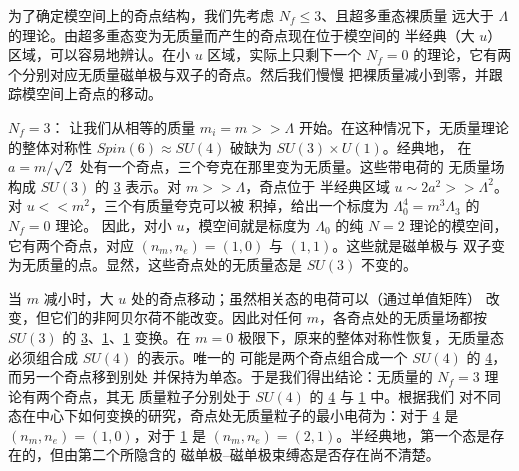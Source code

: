 
为了确定模空间上的奇点结构，我们先考虑 $N_f \leq 3$、且超多重态裸质量
远大于 $\Lambda$ 的理论。由超多重态变为无质量而产生的奇点现在位于模空间的
半经典（大 $u$）区域，可以容易地辨认。在小 $u$ 区域，实际上只剩下一个
$N_f=0$ 的理论，它有两个分别对应无质量磁单极与双子的奇点。然后我们慢慢
把裸质量减小到零，并跟踪模空间上奇点的移动。

\noindent\underline{$N_f = 3$}：
让我们从相等的质量 $m_i = m >> \Lambda$ 开始。在这种情况下，无质量理论
的整体对称性 $Spin(6)\approx SU(4)$ 破缺为 $SU(3) \times U(1)$。经典地，
在 $a = m/ \sqrt{2}$ 处有一个奇点，三个夸克在那里变为无质量。这些带电荷的
无质量场构成 $SU(3)$ 的 \underline{3} 表示。对 $m >> \Lambda$，奇点位于
半经典区域 $u \sim 2a^2 >> \Lambda^2$。对 $u<< m^2$，三个有质量夸克可以被
积掉，给出一个标度为 $\Lambda^{4}_{0} = m^3 \Lambda_3$ 的 $N_f=0$ 理论。
因此，对小 $u$，模空间就是标度为 $\Lambda_{0}$ 的纯 $N = 2$ 理论的模空间，
它有两个奇点，对应 $(n_m , n_e) = (1,0)$ 与 $(1,1)$。这些就是磁单极与
双子变为无质量的点。显然，这些奇点处的无质量态是 $SU(3)$ 不变的。

当 $m$ 减小时，大 $u$ 处的奇点移动；虽然相关态的电荷可以（通过单值矩阵）
改变，但它们的非阿贝尔荷不能改变。因此对任何 $m$，各奇点处的无质量场都按
$SU(3)$ 的 \underline{3}、\underline{1}、\underline{1} 变换。在 $m = 0$
极限下，原来的整体对称性恢复，无质量态必须组合成 $SU(4)$ 的表示。唯一的
可能是两个奇点组合成一个 $SU(4)$ 的 \underline{4}，而另一个奇点移到别处
并保持为单态。于是我们得出结论：无质量的 $N_f = 3$ 理论有两个奇点，其无
质量粒子分别处于 $SU(4)$ 的 \underline{4} 与 \underline{1} 中。根据我们
对不同态在中心下如何变换的研究，奇点处无质量粒子的最小电荷为：对于
\underline{4} 是 $(n_m , n_e) = (1,0)$，对于 \underline{1} 是
$(n_m, n_e) = (2,1)$。半经典地，第一个态是存在的，但由第二个所隐含的
磁单极--磁单极束缚态是否存在尚不清楚。


